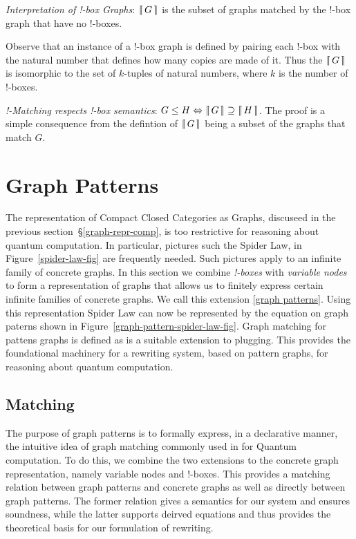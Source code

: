 \documentclass[runningheads]{llncs}
\newcommand{\binterp}[1]{\lceil\hspace{-0.27em}|\, #1\, |\hspace{-0.27em}\rceil}
\begin{document}
\begin{definition}
  \emph{Interpretation of !-box Graphs}: $\binterp{G}$ is the subset
  of graphs matched by the !-box graph that have no !-boxes.
\end{definition}

Observe that an instance of a !-box graph is defined by pairing each
!-box with the natural number that defines how many copies are made of
it. Thus the $\binterp{G}$ is isomorphic to the set of $k$-tuples of
natural numbers, where $k$ is the number of !-boxes.

\begin{theorem}
  \emph{!-Matching respects !-box semantics}: $G \leq H
  \Leftrightarrow \binterp{G} \supseteq \binterp{H}$. The proof is a
  simple consequence from the defintion of $\binterp{G}$ being a
  subset of the graphs that match $G$.
\end{theorem}


\section{Graph Patterns}
\label{sec:patterns}

The representation of Compact Closed Categories as Graphs, discuseed
in the previous section~\S\ref{graph-repr-comp}, is too restrictive
for reasoning about quantum computation. In particular, pictures such
the Spider Law, in Figure~\ref{spider-law-fig} are frequently
needed. Such pictures apply to an infinite family of concrete
graphs. In this section we combine {\em !-boxes} with {\em variable
  nodes} to form a representation of graphs that allows us to finitely
express certain infinite families of concrete graphs. We call this
extension \ref{graph patterns}. Using this representation Spider Law
can now be represented by the equation on graph paterns shown in
Figure~\ref{graph-pattern-spider-law-fig}. Graph matching for pattens
graphs is defined as is a suitable extension to plugging. This
provides the foundational machinery for a rewriting system, based on
pattern graphs, for reasoning about quantum computation. 

\subsection{Matching}

The purpose of graph patterns is to formally express, in a declarative
manner, the intuitive idea of graph matching commonly used in for
Quantum computation. To do this, we combine the two extensions to the
concrete graph representation, namely variable nodes and !-boxes. This
provides a matching relation between graph patterns and concrete
graphs as well as directly between graph patterns. The former relation
gives a semantics for our system and ensures soundness, while the
latter supports deirved equations and thus provides the theoretical
basis for our formulation of rewriting.
\end{document}

